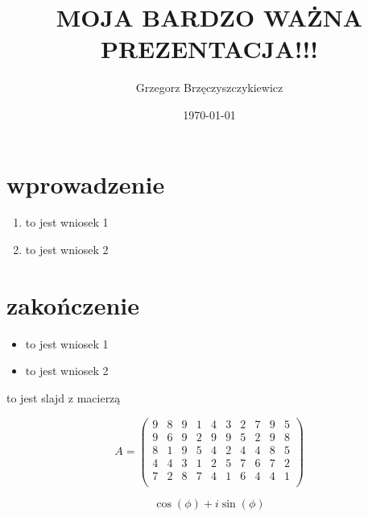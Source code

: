 \documentclass[aspectratio = 169]{beamer}
\title{MOJA BARDZO WAŻNA PREZENTACJA!!!}
\author{Grzegorz Brzęczyszczykiewicz}
\date{\today}
\begin{document}
\begin{frame}
    \titlepage
\end{frame}

\begin{frame}
    \tableofcontents
\end{frame}

\section{wprowadzenie}

\begin{frame}

\begin{enumerate}
    \pause
    \item to jest wniosek 1
    \pause
    \item to jest wniosek 2
\end{enumerate}

\end{frame}

\section{zakończenie}

\begin{frame}

\begin{itemize}
    \pause
    \item to jest wniosek 1
    \pause
    \item to jest wniosek 2
\end{itemize}

\end{frame}

\begin{frame}{to jest slajd z macierzą}

\[
A = \left(
\begin{array}{cccccccccc}
 9 & 8 & 9 & 1 & 4 & 3 & 2 & 7 & 9 & 5 \\
 9 & 6 & 9 & 2 & 9 & 9 & 5 & 2 & 9 & 8 \\
 8 & 1 & 9 & 5 & 4 & 2 & 4 & 4 & 8 & 5 \\
 4 & 4 & 3 & 1 & 2 & 5 & 7 & 6 & 7 & 2 \\
 7 & 2 & 8 & 7 & 4 & 1 & 6 & 4 & 4 & 1 \\
\end{array}
\right)
\]

\end{frame}

\begin{frame}
    
\[
\cos (\phi )+i \sin (\phi )
\]

\end{frame}
\end{document}

